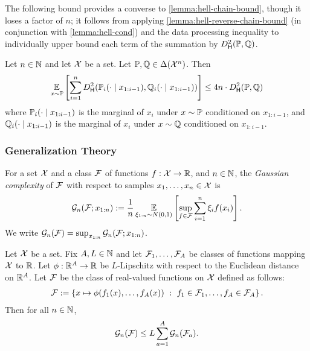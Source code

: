 The following bound provides a converse to \cref{lemma:hell-chain-bound}, though it loses a factor of $n$; it follows from applying \cref{lemma:hell-reverse-chain-bound} (in conjunction with \cref{lemma:hell-cond}) and the data processing inequality to individually upper bound each term of the summation by $\Dhels{\BP}{\BQ}$.

\begin{corollary}\label{cor:hell-reverse-chain-bound}
Let $n \in \mathbb{N}$ and let $\mathcal{X}$ be a set. Let $\mathbb{P}, \mathbb{Q} \in \Delta(\mathcal{X}^n)$. Then 
\[\EE_{x \sim \BP}\left[ \sum_{i=1}^n \Dhels{\BP_i(\cdot\mid{}x_{1:i-1})}{\BQ_i(\cdot\mid{}x_{1:i-1})}\right] \leq 4n \cdot \Dhels{\BP}{\BQ}\]
where $\mathbb{P}_i(\cdot\mid{}x_{1:i-1})$ is the marginal of $x_i$ under $x \sim \mathbb{P}$ conditioned on $x_{1:i-1}$, and $\mathbb{Q}_i(\cdot\mid{}x_{1:i-1})$ is the marginal of $x_i$ under $x \sim \mathbb{Q}$ conditioned on $x_{1:i-1}$.
\end{corollary}

\subsubsection{Generalization Theory}

\begin{definition}
\label{def:gaussian_complexity}
For a set $\mathcal{X}$ and a class $\mathcal{F}$ of functions $f : \mathcal{X} \to \mathbb{R}$, and $n \in \mathbb{N}$, the \emph{Gaussian complexity} of $\mathcal{F}$ with respect to samples $x_1, \ldots, x_n \in \mathcal{X}$ is
\[\mathcal{G}_n(\mathcal{F}; x_{1:n}) := \frac{1}{n}\operatorname*{\mathbb{E}}_{\xi_{1:n} \sim N(0,1)}\left[\sup_{f\in\mathcal{F}} \sum_{i=1}^n \xi_i f(x_i) \right].\] 
We write $\mathcal{G}_n(\mathcal{F}) = \sup_{x_{1:n}} \mathcal{G}_n(\mathcal{F};x_{1:n})$.
\end{definition}



\begin{lemma}
  \label{lem:rc-composition}
  Let $\mathcal{X}$ be a set. Fix $A,L \in \mathbb{N}$ and let $\mathcal{F}_1, \ldots, \mathcal{F}_A$ be classes of functions mapping $\mathcal{X}$ to $\mathbb{R}$. Let $\phi : \mathbb{R}^A \to \mathbb{R}$ be $L$-Lipschitz with respect to the Euclidean distance on $\mathbb{R}^A$. Let $\mathcal{F}$ be the class of real-valued functions on $\mathcal{X}$ defined as follows:\loose
  \begin{align}
\mathcal{F} := \left\{ x \mapsto \phi(f_1(x), \ldots, f_A(x)) \ : \ f_1 \in \mathcal{F}_1, \ldots, f_A \in \mathcal{F}_A \right\}\nonumber.
  \end{align}
  Then for all $n \in \mathbb{N}$, 
  \begin{align}
\mathcal{G}_n(\mathcal{F}) \leq L \sum_{a=1}^A \mathcal{G}_n(\mathcal{F}_a)\nonumber.
  \end{align}
\end{lemma}


